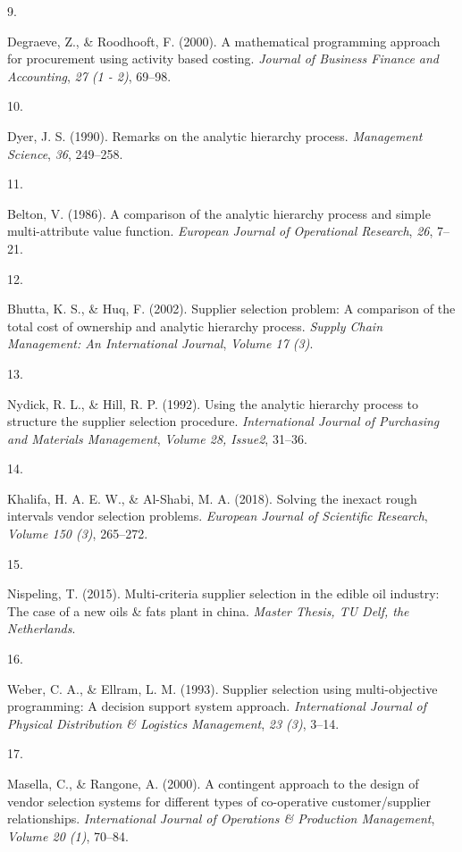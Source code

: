\documentclass[preprint, 3p,
authoryear]{elsarticle} %
\newlength{\cslhangindent}
\newlength{\csllabelwidth}
\newlength{\cslentryspacingunit} %
\newenvironment{CSLReferences}[2] %
 {%
  \setlength{\parindent}{0pt}
  \ifodd #1
  \let\oldpar\par
  \def\par{\hangindent=\cslhangindent\oldpar}
  \fi
  \setlength{\parskip}{#2\cslentryspacingunit}
 }%
 {}
\newcommand{\CSLLeftMargin}[1]{\parbox[t]{\csllabelwidth}{#1}}
\newcommand{\CSLRightInline}[1]{\parbox[t]{\linewidth - \csllabelwidth}{#1}\break}
\begin{document}
\begin{CSLReferences}{0}{0}
\leavevmode{}%
\CSLLeftMargin{9. }%
\CSLRightInline{Degraeve, Z., \& Roodhooft, F. (2000). A mathematical
programming approach for procurement using activity based costing.
\emph{Journal of Business Finance and Accounting}, \emph{27 (1 - 2)},
69--98.}

\leavevmode{}%
\CSLLeftMargin{10. }%
\CSLRightInline{Dyer, J. S. (1990). Remarks on the analytic hierarchy
process. \emph{Management Science}, \emph{36}, 249--258.}

\leavevmode{}%
\CSLLeftMargin{11. }%
\CSLRightInline{Belton, V. (1986). A comparison of the analytic
hierarchy process and simple multi-attribute value function.
\emph{European Journal of Operational Research}, \emph{26}, 7--21.}

\leavevmode{}%
\CSLLeftMargin{12. }%
\CSLRightInline{Bhutta, K. S., \& Huq, F. (2002). Supplier selection
problem: A comparison of the total cost of ownership and analytic
hierarchy process. \emph{Supply Chain Management: An International
Journal}, \emph{Volume 17 (3)}.}

\leavevmode{}%
\CSLLeftMargin{13. }%
\CSLRightInline{Nydick, R. L., \& Hill, R. P. (1992). Using the analytic
hierarchy process to structure the supplier selection procedure.
\emph{International Journal of Purchasing and Materials Management},
\emph{Volume 28, Issue2}, 31--36.}

\leavevmode{}%
\CSLLeftMargin{14. }%
\CSLRightInline{Khalifa, H. A. E. W., \& Al-Shabi, M. A. (2018). Solving
the inexact rough intervals vendor selection problems. \emph{European
Journal of Scientific Research}, \emph{Volume 150 (3)}, 265--272.}

\leavevmode{}%
\CSLLeftMargin{15. }%
\CSLRightInline{Nispeling, T. (2015). Multi-criteria supplier selection
in the edible oil industry: The case of a new oils \& fats plant in
china. \emph{Master Thesis, TU Delf, the Netherlands}.}

\leavevmode{}%
\CSLLeftMargin{16. }%
\CSLRightInline{Weber, C. A., \& Ellram, L. M. (1993). Supplier
selection using multi-objective programming: A decision support system
approach. \emph{International Journal of Physical Distribution \&
Logistics Management}, \emph{23 (3)}, 3--14.}

\leavevmode{}%
\CSLLeftMargin{17. }%
\CSLRightInline{Masella, C., \& Rangone, A. (2000). A contingent
approach to the design of vendor selection systems for different types
of co-operative customer/supplier relationships. \emph{International
Journal of Operations \& Production Management}, \emph{Volume 20 (1)},
70--84.}


\end{CSLReferences}
\end{document}
